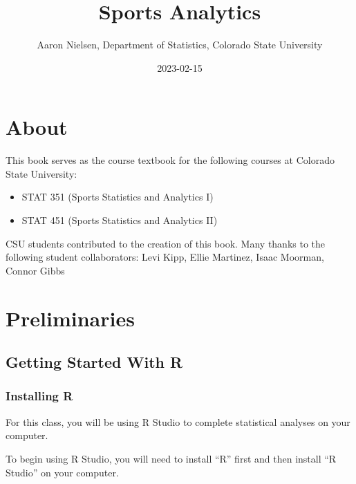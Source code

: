 \documentclass[
  11pt,
]{book}
\title{Sports Analytics}
\author{Aaron Nielsen, Department of Statistics, Colorado State University}
\date{2023-02-15}
\theoremstyle{definition}
\theoremstyle{definition}
\theoremstyle{definition}
\theoremstyle{definition}
\theoremstyle{remark}
\begin{document}
\maketitle

{
\setcounter{tocdepth}{1}
\tableofcontents
}
\hypertarget{about}{%
\chapter*{About}\label{about}}

This book serves as the course textbook for the following courses at Colorado State University:

\begin{itemize}
\item
  STAT 351 (Sports Statistics and Analytics I)
\item
  STAT 451 (Sports Statistics and Analytics II)
\end{itemize}

\hfill\break

CSU students contributed to the creation of this book. Many thanks to the following student collaborators: Levi Kipp, Ellie Martinez, Isaac Moorman, Connor Gibbs

\hypertarget{preliminaries}{%
\chapter*{Preliminaries}\label{preliminaries}}

\hypertarget{getting-started-with-r}{%
\section*{Getting Started With R}\label{getting-started-with-r}}

\hypertarget{installing-r}{%
\subsection*{Installing R}\label{installing-r}}

For this class, you will be using R Studio to complete statistical analyses on your computer.

To begin using R Studio, you will need to install ``R'' first and then install ``R Studio'' on your computer.
\end{document}
